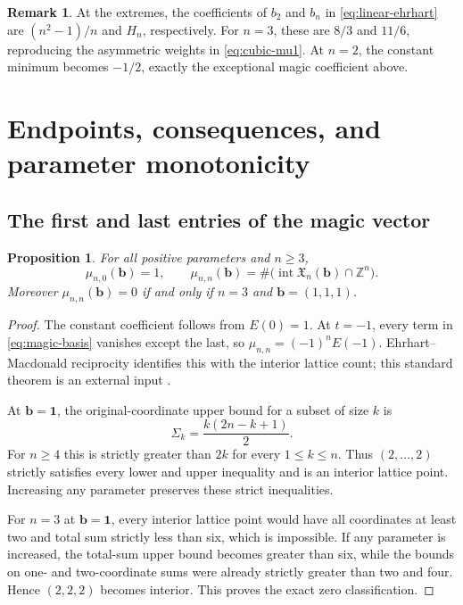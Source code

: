 \documentclass[11pt]{article}
\newtheorem{proposition}[theorem]{Proposition}
\theoremstyle{definition}
\newtheorem{remark}[theorem]{Remark}
\newcommand{\Z}{\mathbb Z}
\newcommand{\bb}{\mathbf b}
\newcommand{\one}{\mathbf 1}
\newcommand{\X}{\mathfrak X}
\newcommand{\interior}{\operatorname{int}}
\numberwithin{equation}{section}
\begin{document}
\begin{remark}
At the extremes, the coefficients of $b_2$ and $b_n$ in
\eqref{eq:linear-ehrhart} are $(n^2-1)/n$ and $H_n$, respectively.
For $n=3$, these are $8/3$ and $11/6$, reproducing the asymmetric weights
in \eqref{eq:cubic-mu1}. At $n=2$, the constant minimum becomes $-1/2$,
exactly the exceptional magic coefficient above.
\end{remark}

\section{Endpoints, consequences, and parameter monotonicity}
\label{sec:consequences}

\subsection{The first and last entries of the magic vector}
\begin{proposition}
\label{prop:endpoints}
For all positive parameters and $n\ge3$,
\[
 \mu_{n,0}(\bb)=1,\qquad
 \mu_{n,n}(\bb)=\#\bigl(\interior\X_n(\bb)\cap\Z^n\bigr).
\]
Moreover $\mu_{n,n}(\bb)=0$ if and only if
$n=3$ and $\bb=(1,1,1)$.
\end{proposition}
\begin{proof}
The constant coefficient follows from $E(0)=1$. At $t=-1$, every term in
\eqref{eq:magic-basis} vanishes except the last, so
$\mu_{n,n}=(-1)^nE(-1)$. Ehrhart--Macdonald reciprocity identifies this with
the interior lattice count; this standard theorem is an external input
\cite{Macdonald,BeckDevelin}.

At $\bb=\one$, the original-coordinate upper bound for a subset of size
$k$ is
\[
 \Sigma_k=\frac{k(2n-k+1)}2.
\]
For $n\ge4$ this is strictly greater than $2k$ for every $1\le k\le n$.
Thus $(2,\ldots,2)$ strictly satisfies every lower and upper inequality
and is an interior lattice point. Increasing any parameter preserves
these strict inequalities.

For $n=3$ at $\bb=\one$, every interior lattice point would have all
coordinates at least two and total sum strictly less than six, which is
impossible. If any parameter is increased, the total-sum upper bound
becomes greater than six, while the bounds on one- and two-coordinate
sums were already strictly greater than two and four. Hence $(2,2,2)$
becomes interior. This proves the exact zero classification.
\end{proof}
\end{document}
